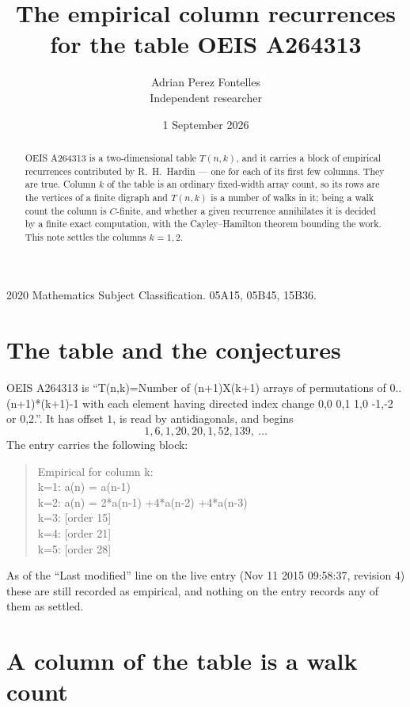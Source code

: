 \documentclass[11pt,a4paper]{article}
\title{The empirical column recurrences for the table OEIS A264313}
\author{Adrian Perez Fontelles\\ \small Independent researcher}
\date{1 September 2026}
\theoremstyle{plain}
\theoremstyle{definition}
\begin{document}
\maketitle

\begin{abstract}
OEIS A264313 is a two-dimensional table $T(n,k)$, and it carries a block of empirical
recurrences contributed by R.~H.~Hardin --- one for each of its first few columns. They are
true. Column $k$ of the table is an ordinary fixed-width array count, so its rows are the
vertices of a finite digraph and $T(n,k)$ is a number of walks in it; being a walk count the
column is $C$-finite, and whether a given recurrence annihilates it is decided by a finite
exact computation, with the Cayley--Hamilton theorem bounding the work. This note settles the columns $k=1, 2$.
\end{abstract}

\noindent\small 2020 Mathematics Subject Classification. 05A15, 05B45, 15B36.\normalsize

\section{The table and the conjectures}

OEIS A264313 is ``T(n,k)=Number of (n+1)X(k+1) arrays of permutations of 0..(n+1)*(k+1)-1 with each element having directed index change 0,0 0,1 1,0 -1,-2 or 0,2.''. It has offset $1$, is
read by antidiagonals, and begins
\[
1, 6, 1, 20, 20, 1, 52, 139,\ \dots
\]
The entry carries the following block:
\begin{quote}\small
Empirical for column k:\\
k=1: a(n) = a(n-1)\\
k=2: a(n) = 2*a(n-1) +4*a(n-2) +4*a(n-3)\\
k=3: [order 15]\\
k=4: [order 21]\\
k=5: [order 28]\\
\end{quote}
As of the ``Last modified'' line on the live entry (Nov 11 2015 09:58:37, revision 4) these are still
recorded as empirical, and nothing on the entry records any of them as settled.

\section{A column of the table is a walk count}
\end{document}
